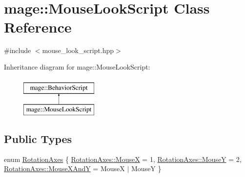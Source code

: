 \hypertarget{classmage_1_1_mouse_look_script}{}\section{mage\+:\+:Mouse\+Look\+Script Class Reference}
\label{classmage_1_1_mouse_look_script}


{\ttfamily \#include $<$mouse\+\_\+look\+\_\+script.\+hpp$>$}

Inheritance diagram for mage\+:\+:Mouse\+Look\+Script\+:\begin{figure}[H]
\begin{center}
\leavevmode
\includegraphics[height=2.000000cm]{classmage_1_1_mouse_look_script}
\end{center}
\end{figure}
\subsection*{Public Types}
\begin{DoxyCompactItemize}
\item 
enum \hyperlink{classmage_1_1_mouse_look_script_af63fd955f796c11e0378813e5d1ab5f8}{Rotation\+Axes} \{ \hyperlink{classmage_1_1_mouse_look_script_af63fd955f796c11e0378813e5d1ab5f8abf27c48f8a38ed19eeeba089dd8d3ba1}{Rotation\+Axes\+::\+MouseX} = 1, 
\hyperlink{classmage_1_1_mouse_look_script_af63fd955f796c11e0378813e5d1ab5f8a73843207a289db41b16a5bb8254ca425}{Rotation\+Axes\+::\+MouseY} = 2, 
\hyperlink{classmage_1_1_mouse_look_script_af63fd955f796c11e0378813e5d1ab5f8a109431b32c091e8a7ad541546c66c522}{Rotation\+Axes\+::\+Mouse\+X\+AndY} = MouseX $\vert$ MouseY
 \}
\end{DoxyCompactItemize}
